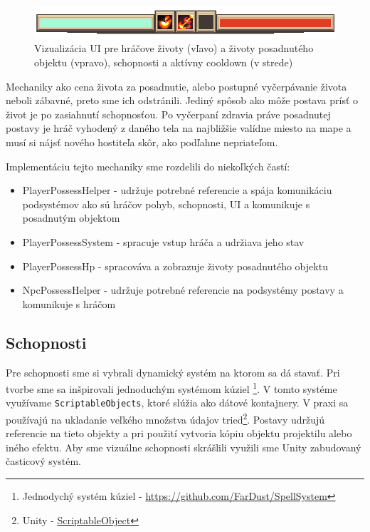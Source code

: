 \begin{figure} [H]
    \centering
    \includegraphics[width=0.75\linewidth]{obrazky-figures/spellbar.png}
    \caption{Vizualizácia UI pre hráčove životy (vľavo) a životy posadnutého objektu (vpravo), schopnosti a aktívny cooldown (v strede)}
    \label{fig:spellbar}
\end{figure}

Mechaniky ako cena života za posadnutie, alebo postupné vyčerpávanie života neboli zábavné, preto sme ich odstránili. Jediný spôsob ako môže postava prísť o život je po zasiahnutí schopnosťou. Po vyčerpaní zdravia práve posadnutej postavy je hráč vyhodený z daného tela na najbližšie valídne miesto na mape a musí si nájsť nového hostiteľa skôr, ako podľahne nepriateľom.

Implementáciu tejto mechaniky sme rozdelili do niekoľkých častí:

\begin{itemize}
    \item PlayerPossessHelper - udržuje potrebné referencie a spája komunikáciu podsystémov ako sú hráčov pohyb, schopnosti, UI a komunikuje s posadnutým objektom
    \item PlayerPossessSystem - spracuje vstup hráča a udržiava jeho stav
    \item PlayerPossessHp - spracováva a zobrazuje životy posadnutého objektu
    \item NpcPossessHelper - udržuje potrebné referencie na podsystémy postavy a komunikuje s hráčom 
\end{itemize}

\subsection{Schopnosti}

Pre schopnosti sme si vybrali dynamický systém na ktorom sa dá stavať. Pri tvorbe sme sa inšpirovali jednoduchým systémom kúziel \footnote{Jednodychý systém kúziel - \url{https://github.com/FarDust/SpellSystem}}. V tomto systéme využívame \verb|ScriptableObjects|, ktoré slúžia ako dátové kontajnery. V praxi sa používajú na ukladanie veľkého množstva údajov tried\footnote{Unity - \href{https://docs.unity3d.com/Manual/class-ScriptableObject.html}{ ScriptableObject}}. Postavy udržujú referencie na tieto objekty a pri použití vytvoria kópiu objektu projektilu alebo iného efektu. Aby sme vizuálne schopnosti skrášlili využili sme Unity zabudovaný časticový systém. 

